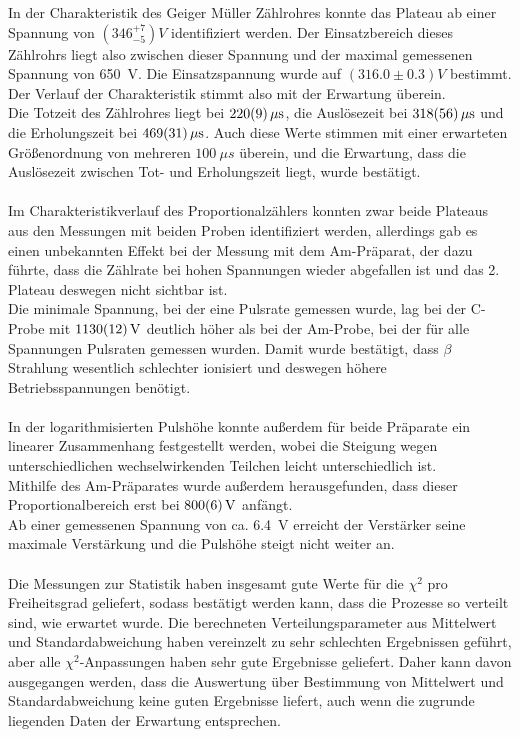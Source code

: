 \documentclass[12pt,a4paper]{article}
\begin{document}
In der Charakteristik des Geiger Müller Zählrohres konnte das Plateau ab einer Spannung von $(346_{-5}^{+7})\si{V}$ identifiziert werden. Der Einsatzbereich dieses Zählrohrs liegt also zwischen dieser Spannung und der maximal gemessenen Spannung von \SI{650}{V}. Die Einsatzspannung wurde auf $(316.0\pm 0.3) \si{V}$ bestimmt.\\
Der Verlauf der Charakteristik stimmt also mit der Erwartung überein.
\\
Die Totzeit des Zählrohres liegt bei $\SI{220 \pm 9}{\mu s}$, die Auslösezeit bei $\SI{318 \pm 56}{\mu s}$ und die Erholungszeit bei $\SI{469 \pm 31}{\mu s}$. Auch diese Werte stimmen mit einer erwarteten Größenordnung von mehreren $\SI{100}{\mu s}$ überein, und die Erwartung, dass die Auslösezeit zwischen Tot- und Erholungszeit liegt, wurde bestätigt.\\
\\
Im Charakteristikverlauf des Proportionalzählers konnten zwar beide Plateaus aus den Messungen mit beiden Proben identifiziert werden, allerdings gab es einen unbekannten Effekt bei der Messung mit dem Am-Präparat, der dazu führte, dass die Zählrate bei hohen Spannungen wieder abgefallen ist und das 2. Plateau deswegen nicht sichtbar ist.\\
Die minimale Spannung, bei der eine Pulsrate gemessen wurde, lag bei der C-Probe mit $\SI{1130 \pm 12}{V}$ deutlich höher als bei der Am-Probe, bei der für alle Spannungen Pulsraten gemessen wurden. Damit wurde bestätigt, dass $\beta$ Strahlung wesentlich schlechter ionisiert und deswegen höhere Betriebsspannungen benötigt.\\
\\
In der logarithmisierten Pulshöhe konnte außerdem für beide Präparate ein linearer Zusammenhang festgestellt werden, wobei die Steigung wegen unterschiedlichen wechselwirkenden Teilchen leicht unterschiedlich ist.\\
Mithilfe des Am-Präparates wurde außerdem herausgefunden, dass dieser Proportionalbereich erst bei $\SI{800 \pm 6}{V}$ anfängt.\\
Ab einer gemessenen Spannung von ca. \SI{6.4}{V} erreicht der Verstärker seine maximale Verstärkung und die Pulshöhe steigt nicht weiter an. \\
\\
Die Messungen zur Statistik haben insgesamt gute Werte für die $\chi ^2$ pro Freiheitsgrad geliefert, sodass bestätigt werden kann, dass die Prozesse so verteilt sind, wie erwartet wurde. Die berechneten Verteilungsparameter aus Mittelwert und Standardabweichung haben vereinzelt zu sehr schlechten Ergebnissen geführt, aber alle $\chi ^2$-Anpassungen haben sehr gute Ergebnisse geliefert. Daher kann davon ausgegangen werden, dass die Auswertung über Bestimmung von Mittelwert und Standardabweichung keine guten Ergebnisse liefert, auch wenn die zugrunde liegenden Daten der Erwartung entsprechen.






	
\end{document}
